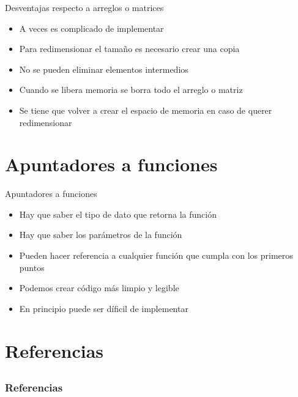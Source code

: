 \documentclass{beamer}
\begin{document}
\begin{frame}{Desventajas respecto a arreglos o matrices}
	\begin{itemize}
		\item A veces es complicado de implementar 
		\item Para redimensionar el tamaño es necesario crear una copia
		\item No se pueden eliminar elementos intermedios
		\item Cuando se libera memoria se borra todo el arreglo o matriz
		\item Se tiene que volver a crear el espacio de memoria en caso de querer redimensionar
	\end{itemize}
\end{frame}

\section{Apuntadores a funciones}

\begin{frame}{Apuntadores a funciones}
	\begin{itemize}
		\item Hay que saber el tipo de dato que retorna la funci\'on
		\item Hay que saber los par\'ametros de la funci\'on
		\item Pueden hacer referencia a cualquier funci\'on que cumpla con los primeros puntos
		\item Podemos crear c\'odigo m\'as limpio y legible
		\item En principio puede ser d\'ificil de implementar
	\end{itemize}
\end{frame}

\section{Referencias}
\subsection{}
\begin{frame}[allowframebreaks]
	
	\frametitle{Referencias}
	
	
\end{frame}
\end{document}
